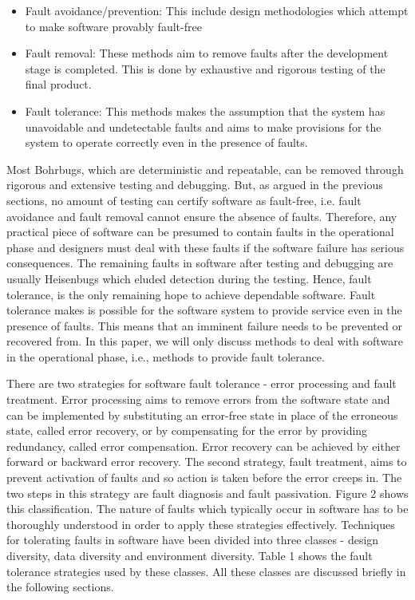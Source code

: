 \documentclass[a4paper, 11pt]{article}
\begin{document}
\begin{itemize}
\item Fault avoidance/prevention: This include design methodologies which attempt to make software provably fault-free
\item Fault removal: These methods aim to remove faults after the development stage is completed. This is done by exhaustive and rigorous testing of the final product.
\item Fault tolerance: This methods makes the assumption that the system has unavoidable and undetectable faults and aims to make provisions for the system to operate correctly even in the presence of faults.
\end{itemize}

Most Bohrbugs, which are deterministic and repeatable, can be removed through rigorous and extensive testing and debugging. But, as argued in the previous sections, no amount of testing can certify software as fault-free, i.e. fault avoidance and fault removal cannot ensure the absence of faults. Therefore, any practical piece of software can be presumed to contain faults in the operational phase and designers must deal with these faults if the software failure has serious consequences. The remaining faults in software after testing and debugging are usually Heisenbugs which eluded detection during the testing. Hence, fault tolerance, is the only remaining hope to achieve dependable software. Fault tolerance makes is possible for the software system to provide service even in the presence of faults. This means that an imminent failure needs to be prevented or recovered from. In this paper, we will only discuss methods to deal with software in the operational phase, i.e., methods to provide fault tolerance.

There are two strategies for software fault tolerance - error processing and fault treatment. Error processing aims to remove errors from the software state and can be implemented by substituting an error-free state in place of the erroneous state, called error recovery, or by compensating for the error by providing redundancy, called error compensation. Error recovery can be achieved by either forward or backward error recovery. The second strategy, fault treatment, aims to prevent activation of faults and so action is taken before the error creeps in. The two steps in this strategy are fault diagnosis and fault passivation. Figure 2 shows this classification. The nature of faults which typically occur in software has to be thoroughly understood in order to apply these strategies effectively. Techniques for tolerating faults in software have been divided into three classes - design diversity, data diversity and environment diversity. Table 1 shows the fault tolerance strategies used by these classes. All these classes are discussed briefly in the following sections.
\end{document}
